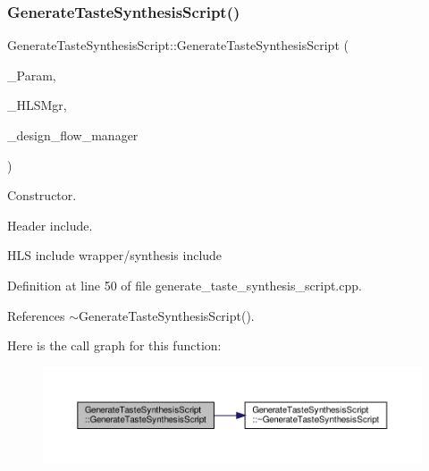 \subsubsection{\texorpdfstring{Generate\+Taste\+Synthesis\+Script()}{GenerateTasteSynthesisScript()}}
{\footnotesize\ttfamily Generate\+Taste\+Synthesis\+Script\+::\+Generate\+Taste\+Synthesis\+Script (\begin{DoxyParamCaption}\item[{const \hyperlink{Parameter_8hpp_a37841774a6fcb479b597fdf8955eb4ea}{Parameter\+Const\+Ref}}]{\+\_\+\+Param,  }\item[{const \hyperlink{hls__manager_8hpp_acd3842b8589fe52c08fc0b2fcc813bfe}{H\+L\+S\+\_\+manager\+Ref}}]{\+\_\+\+H\+L\+S\+Mgr,  }\item[{const Design\+Flow\+Manager\+Const\+Ref}]{\+\_\+design\+\_\+flow\+\_\+manager }\end{DoxyParamCaption})}



Constructor. 

Header include.

H\+LS include wrapper/synthesis include 

Definition at line 50 of file generate\+\_\+taste\+\_\+synthesis\+\_\+script.\+cpp.



References $\sim$\+Generate\+Taste\+Synthesis\+Script().

Here is the call graph for this function\+:
\nopagebreak
\begin{figure}[H]
\begin{center}
\leavevmode
\includegraphics[width=350pt]{d3/d54/classGenerateTasteSynthesisScript_a83f8f31d125253e6a8298a03ee2863ed_cgraph}
\end{center}
\end{figure}
\mbox{\label{classGenerateTasteSynthesisScript_a3eef3d4e0e73974ea2bd47ebd59fe08a}} 
